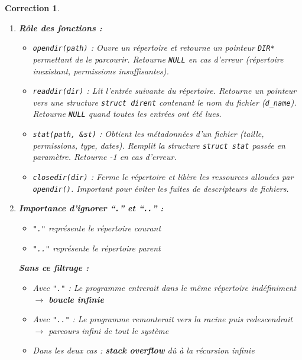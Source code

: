 \documentclass[a4paper,11pt]{article}
\theoremstyle{plain}
\newtheorem{correction}{Correction}
\theoremstyle{definition}
\begin{document}
\begin{correction}

\begin{enumerate}
\item \textbf{Rôle des fonctions :}

\begin{itemize}
\item \texttt{opendir(path)} : Ouvre un répertoire et retourne un pointeur \texttt{DIR*} permettant de le parcourir. Retourne \texttt{NULL} en cas d'erreur (répertoire inexistant, permissions insuffisantes).

\item \texttt{readdir(dir)} : Lit l'entrée suivante du répertoire. Retourne un pointeur vers une structure \texttt{struct dirent} contenant le nom du fichier (\texttt{d\_name}). Retourne \texttt{NULL} quand toutes les entrées ont été lues.

\item \texttt{stat(path, \&st)} : Obtient les métadonnées d'un fichier (taille, permissions, type, dates). Remplit la structure \texttt{struct stat} passée en paramètre. Retourne -1 en cas d'erreur.

\item \texttt{closedir(dir)} : Ferme le répertoire et libère les ressources allouées par \texttt{opendir()}. Important pour éviter les fuites de descripteurs de fichiers.
\end{itemize}

\item \textbf{Importance d'ignorer ``\texttt{.}'' et ``\texttt{..}'' :}

\begin{itemize}
\item \texttt{"."} représente le répertoire courant
\item \texttt{".."} représente le répertoire parent
\end{itemize}

\textbf{Sans ce filtrage :}
\begin{itemize}
\item Avec \texttt{"."} : Le programme entrerait dans le même répertoire indéfiniment $\rightarrow$ \textbf{boucle infinie}
\item Avec \texttt{".."} : Le programme remonterait vers la racine puis redescendrait $\rightarrow$ parcours infini de tout le système
\item Dans les deux cas : \textbf{stack overflow} dû à la récursion infinie
\end{itemize}


\end{enumerate}
\end{correction}
\end{document}
